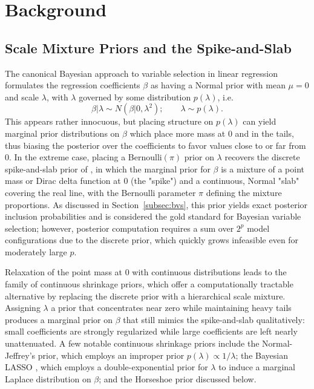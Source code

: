 \section{Background}
\label{sec:ch3-background}

\subsection{Scale Mixture Priors and the Spike-and-Slab}
\label{subsec:ch3-scale-mix}

The canonical Bayesian approach to variable selection in linear regression
formulates the regression coefficients $\beta$ as having a Normal prior with mean $\mu = 0$ and scale $\lambda$, with $\lambda$ governed by some distribution $p(\lambda)$, i.e. 
\begin{equation}
      \beta|\lambda \sim N(\beta | 0, \lambda^2);     \qquad     \lambda \sim p(\lambda).
\end{equation}
This appears rather innocuous, but placing structure on $p(\lambda)$ can yield marginal prior distributions on $\beta$ which place more mass at 0 and in the tails, thus biasing the posterior over the coefficients to favor values close to or far from 0.  In the extreme case, placing a Bernoulli$(\pi)$ prior on $\lambda$ recovers the discrete spike-and-slab prior of
\citep{mitchell_bayesian_1988, george_approaches_1997}, in which the marginal prior for $\beta$ is a mixture of a point mass or Dirac delta function at 0 (the "spike") and a continuous, Normal "slab" covering the real line, with the Bernoulli parameter $\pi$ defining the mixture proportions.  As discussed in
Section~\ref{subsec:bvs}, this prior yields exact posterior
inclusion probabilities and is considered the gold standard for
Bayesian variable selection; however, posterior computation requires
a sum over $2^p$ model configurations due to the discrete prior, which quickly grows infeasible 
even for moderately large $p$.

Relaxation of the point mass at 0 with continuous distributions leads to the family of continuous shrinkage priors, which offer a computationally tractable
alternative by replacing the discrete prior with a hierarchical scale mixture.  Assigning $\lambda$ a prior that concentrates near zero while
maintaining heavy tails produces a marginal prior on $\beta$
that still mimics the spike-and-slab qualitatively: small coefficients
are strongly regularized while large coefficients are left nearly
unattenuated.  A few notable continuous shrinkage priors include the Normal-Jeffrey's prior, which employs an improper prior $p(\lambda) \propto 1/ \lambda$; the Bayesian LASSO \citet{park_bayesian_2008}, which employs a double-exponential prior for $\lambda$ to induce a marginal Laplace distribution on $\beta$; and the Horseshoe prior \citep{carvalho2010horseshoe} discussed below.

